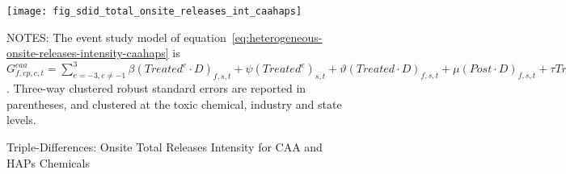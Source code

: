 \begin{figure}[H]
    \centering
    \texttt{[image: fig\_sdid\_total\_onsite\_releases\_int\_caahaps]}
    \caption{Triple-Differences: Onsite Total Releases Intensity for CAA and HAPs Chemicals}
    \label{fig:heterogeneous-onsite-releases-intensity-caa-haps}
    \begin{minipage}{\columnwidth}
        \vspace{0.05in}
        \tiny NOTES: The event study model of equation~\ref{eq:heterogeneous-onsite-releases-intensity-caahaps} is $G_{f,cp,c,t}^{caa} = \sum_{{e = -3},{e \neq -1}}^{3} \beta (Treated^{e} \cdot D)_{f,s,t} + \psi (Treated^{e})_{s,t} + \vartheta (Treated \cdot D)_{f,s,t} + \mu (Post \cdot D)_{f,s,t} + \tau Treated_{s,t} + \rho D_{f,s,t} + \alpha Post_{t} + \delta X_{v,c,t-1} + \omega F_{f,t} + \lambda_{t} + \gamma_{f} + \phi_{cp} + \zeta_{c} + \eta_{c,t} + \theta_{cp,t} + \varepsilon_{f,cp,c,t}$. Three-way clustered robust standard errors are reported in parentheses, and clustered at the toxic chemical, industry and state levels.
    \end{minipage}
\end{figure}